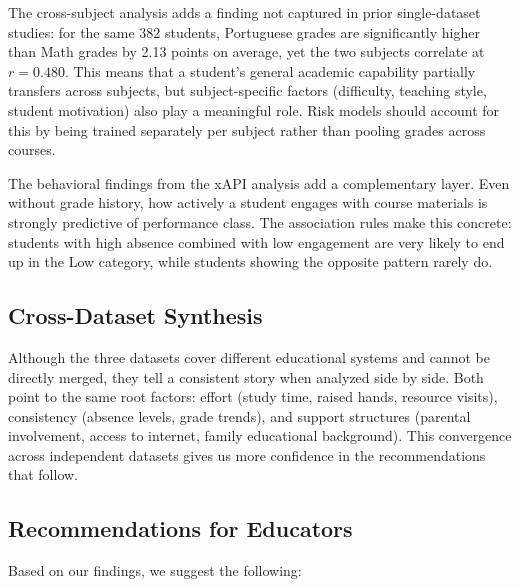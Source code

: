 \documentclass[conference]{IEEEtran}
\begin{document}
The cross-subject analysis adds a finding not captured in prior single-dataset studies: for the same 382 students, Portuguese grades are significantly higher than Math grades by 2.13 points on average, yet the two subjects correlate at $r = 0.480$. This means that a student's general academic capability partially transfers across subjects, but subject-specific factors (difficulty, teaching style, student motivation) also play a meaningful role. Risk models should account for this by being trained separately per subject rather than pooling grades across courses.

The behavioral findings from the xAPI analysis add a complementary layer. Even without grade history, how actively a student engages with course materials is strongly predictive of performance class. The association rules make this concrete: students with high absence combined with low engagement are very likely to end up in the Low category, while students showing the opposite pattern rarely do.

\subsection{Cross-Dataset Synthesis}

Although the three datasets cover different educational systems and cannot be directly merged, they tell a consistent story when analyzed side by side. Both point to the same root factors: effort (study time, raised hands, resource visits), consistency (absence levels, grade trends), and support structures (parental involvement, access to internet, family educational background). This convergence across independent datasets gives us more confidence in the recommendations that follow.

\subsection{Recommendations for Educators}

Based on our findings, we suggest the following:
\end{document}
